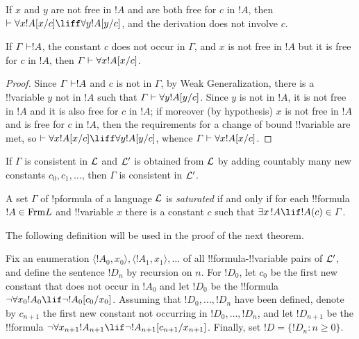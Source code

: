 \documentclass[../../include/open-logic-section]{subfiles}
\begin{document}

\begin{prop}
If $x$ and $y$ are not free in $!A$ and are both free for $c$ in $!A$,
then $\Proves \lforall[x] !A[x/c] \liff \lforall[y] !A[y/c]$, and the
derivation does not involve $c$.
\end{prop}

\begin{thm}
If $\Gamma \Proves !A$, the constant $c$ does not occur in $\Gamma$,
and $x$ is not free in $!A$ but it is free for $c$ in $!A$, then
$\Gamma \Proves \lforall[x] !A[x/c]$.
\end{thm}

\begin{proof}
Since $\Gamma \Proves !A$ and $c$ is not in $\Gamma$, by Weak
Generalization, there is a !!{variable} $y$ not in $!A$ such that $\Gamma
\Proves \lforall[y] !A [y/c]$.  Since $y$ is not in $!A$, it is not
free in $!A$ and it is also free for $c$ in $!A$; if moreover (by
hypothesis) $x$ is not free in $!A$ and is free for $c$ in $!A$, then
the requirements for a change of bound !!{variable} are met, so $\Proves
\lforall[x] !A[x/c] \liff \lforall[y] !A[y/c]$, whence $\Gamma \Proves
\lforall[x] !A[x/c]$.
\end{proof}

\begin{lem}
If $\Gamma$ is consistent in $\mathcal L$ and $\mathcal L'$ is obtained from
$\mathcal L$ by adding countably many new constants $c_0, c_1, \dots$,
then $\Gamma$ is consistent in $\mathcal L'$.
\end{lem}

\begin{defn}
  A set $\Gamma$ of !p{formula} of a language $\mathcal L$ is
  \emph{saturated} if and only if for each !!{formula} $!A \in
  \Frm {L}$ and !!{variable} $x$ there is a constant $c$ such that
  $\lexists[x][!A] \lif !A(c) \in \Gamma$.
\end{defn}


The following definition will be used in the proof of the next theorem.

\begin{defn}
Fix an enumeration $\langle !A_0, x_0 \rangle, \langle !A_1, x_1
\rangle, \dots$ of all !!{formula}-!!{variable} pairs of $\mathcal L'$, and
define the sentence $!D_n$ by recursion on $n$. For $!D_0$,
let $c_0$ be the first new constant that does not occur in $!A_0$ and
let $!D_0$ be the !!{formula} $\lnot \lforall[x_0] !A_0 \lif \lnot
!A_0[c_0/x_0]$. Assuming that $!D_0, \dots, !D_n$ have been
defined, denote by $c_{n+1}$ the first new constant not occurring in
$!D_0, \dots, !D_n$, and let $!D_{n+1}$ be the !!{formula}
$\lnot \lforall[x_{n+1}] !A_{n+1} \lif \lnot
!A_{n+1}[c_{n+1}/x_{n+1}]$. Finally, set $!D = \{ !D_n : n
\geq 0 \}$.
\end{defn}
\end{document}
